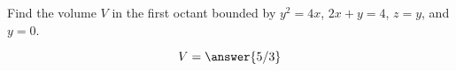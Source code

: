 \documentclass{ximera}
\author{David Guichard \and Neal Koblitz \and H. Jerome Keisler \and Albert Scheller \and Barry Balof \and Mike Wills \and Matthew Carr}
\begin{document}
\begin{exercise}




Find the volume $V$ in the first octant bounded by $y^2=4x$, $2x+y=4$, $z=y$, and $y=0$.
\begin{prompt}
\[
V=\answer{5/3}
\]
\end{prompt}



\end{exercise}
\end{document}
